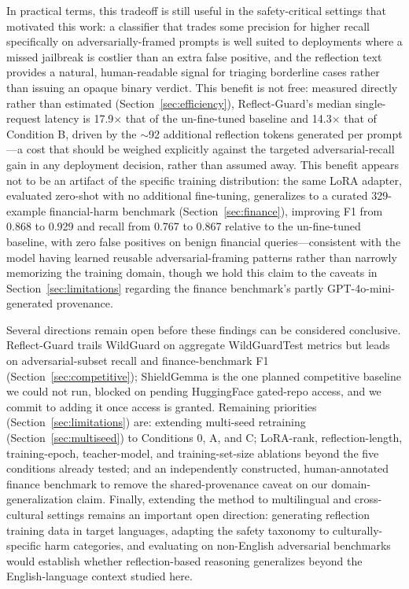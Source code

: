 \documentclass[Superintelligence,article,submit,pdftex,moreauthors]{Definitions/mdpi}
\begin{document}
In practical terms, this tradeoff is still useful in the safety-critical settings that motivated this work: a classifier that trades some precision for higher recall specifically on adversarially-framed prompts is well suited to deployments where a missed jailbreak is costlier than an extra false positive, and the reflection text provides a natural, human-readable signal for triaging borderline cases rather than issuing an opaque binary verdict. This benefit is not free: measured directly rather than estimated (Section~\ref{sec:efficiency}), Reflect-Guard's median single-request latency is 17.9$\times$ that of the un-fine-tuned baseline and 14.3$\times$ that of Condition B, driven by the $\sim$92 additional reflection tokens generated per prompt---a cost that should be weighed explicitly against the targeted adversarial-recall gain in any deployment decision, rather than assumed away. This benefit appears not to be an artifact of the specific training distribution: the same LoRA adapter, evaluated zero-shot with no additional fine-tuning, generalizes to a curated 329-example financial-harm benchmark (Section~\ref{sec:finance}), improving F1 from 0.868 to 0.929 and recall from 0.767 to 0.867 relative to the un-fine-tuned baseline, with zero false positives on benign financial queries---consistent with the model having learned reusable adversarial-framing patterns rather than narrowly memorizing the training domain, though we hold this claim to the caveats in Section~\ref{sec:limitations} regarding the finance benchmark's partly GPT-4o-mini-generated provenance.

Several directions remain open before these findings can be considered conclusive. Reflect-Guard trails WildGuard on aggregate WildGuardTest metrics but leads on adversarial-subset recall and finance-benchmark F1 (Section~\ref{sec:competitive}); ShieldGemma is the one planned competitive baseline we could not run, blocked on pending HuggingFace gated-repo access, and we commit to adding it once access is granted. Remaining priorities (Section~\ref{sec:limitations}) are: extending multi-seed retraining (Section~\ref{sec:multiseed}) to Conditions 0, A, and C; LoRA-rank, reflection-length, training-epoch, teacher-model, and training-set-size ablations beyond the five conditions already tested; and an independently constructed, human-annotated finance benchmark to remove the shared-provenance caveat on our domain-generalization claim. Finally, extending the method to multilingual and cross-cultural settings remains an important open direction: generating reflection training data in target languages, adapting the safety taxonomy to culturally-specific harm categories, and evaluating on non-English adversarial benchmarks would establish whether reflection-based reasoning generalizes beyond the English-language context studied here.
\end{document}
